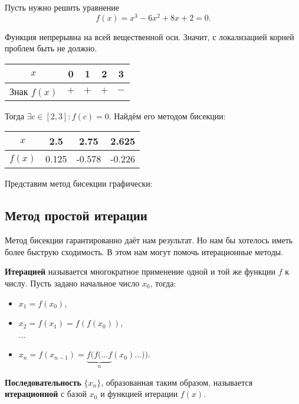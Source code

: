 \documentclass[../main.tex]{subfile}
\begin{document}
\begin{example}
	Пусть нужно решить уравнение
	\[f(x)=x^3-6x^2+8x+2=0.\]

	Функция непрерывна на всей вещественной оси. Значит, с локализацией
	корней проблем быть не должно.
	\newline

	\begin{tabular}{ *{5}{|c}| }
		\hline
		$x$		& 0	& 1	& 2	& 3 \\
		\hline
		Знак $f(x)$ 	& $+$	& $+$	& $+$	& $-$ \\
		\hline
	\end{tabular}
	\newline

	Тогда $\exists c\in[2,3]: f(c)=0$. Найдём его методом бисекции:
	\newline

	\begin{tabular}{*{4}{|c}|}
		\hline
		$x$ &	2.5	& 2.75	& 2.625 \\
		\hline
		$f(x)$ &0.125	& -0.578&-0.226 \\
		\hline
	\end{tabular}\leavevmode\newline

	Представим метод бисекции графически:
	\newline

	

\end{example}


\subsection{Метод простой итерации}

Метод бисекции гарантированно даёт нам результат. Но нам бы хотелось иметь
более быструю сходимость. В этом нам могут помочь итерационные методы.

\begin{define}
	\textbf{Итерацией} называется многократное применение одной и той же
	функции $f$ к числу. Пусть задано начальное число $x_0$, тогда:
	\begin{itemize}[noitemsep, nolistsep]
		\item $x_1=f(x_0)$,
		\item $x_2=f(x_1)=f(f(x_0))$,\\
		...
		\item $x_n=f(x_{n-1})=\underset{n}{\underbrace{f(f(...f}}
			(x_0)...))$.
	\end{itemize}

	\textbf{Последовательность} $\{x_n\}$, образованная таким образом,
	называется \textbf{итерационной} с базой $x_0$ и функцией итерации $f(x)$.
\end{define}
\end{document}
